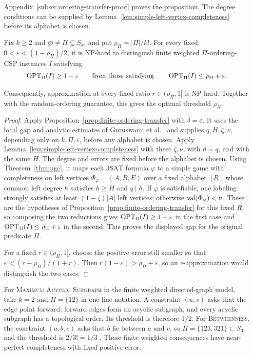 Appendix~\ref{subsec:ordering-transfer-proof} proves the proposition.
The degree conditions can be supplied by Lemma~\ref{lem:simple-left-vertex-completeness}
before its alphabet is chosen.

\begin{corollary}\label{cor:ordering-csp}
Fix \(k\ge2\) and \(\varnothing\ne\Pi\subsetneq S_k\), and put
\(\rho_\Pi=|\Pi|/k!\). For every fixed
\(0<\varepsilon<(1-\rho_\Pi)/2\), it is NP-hard to distinguish finite
weighted \(\Pi\)-ordering-CSP instances \(I\) satisfying
\[
 \operatorname{OPT}_\Pi(I)\ge1-\varepsilon
 \qquad\text{from those satisfying}\qquad
 \operatorname{OPT}_\Pi(I)\le\rho_\Pi+\varepsilon.
\]
\end{corollary}
Consequently, approximation at every fixed ratio
\(r\in(\rho_\Pi,1]\) is NP-hard. Together with the random-ordering
guarantee, this gives the optimal threshold \(\rho_\Pi\).
\begin{proof}
Apply Proposition~\ref{prop:finite-ordering-transfer} with
\(\delta=\varepsilon\). It uses the local gap and analytic estimates of
Guruswami et al.~\cite{GuruswamiEtAl2011OrderingCSP} and supplies
\(q,H,\zeta,\nu\), depending only on \(k,\Pi,\varepsilon\), before any
alphabet is chosen. Apply Lemma~\ref{lem:simple-left-vertex-completeness} with these
\(\zeta,\nu\), with \(d=q\), and with the same \(H\). The degree and errors
are fixed before the alphabet is chosen. Using
Theorem~\ref{thm:ugc}, it maps each \(\mathrm{3SAT}\) formula \(\varphi\)
to a simple game with completeness on left vertices \(\Phi_\varphi=(A,B,E)\) over a fixed
alphabet \([R]\) whose
common left degree \(h\) satisfies \(h\ge H\) and \(q\mid h\). If
\(\varphi\) is satisfiable, one labeling strongly satisfies at least
\((1-\zeta)|A|\) left vertices; otherwise \(\operatorname{val}(\Phi_\varphi)<\nu\).
These are the hypotheses of
Proposition~\ref{prop:finite-ordering-transfer} for this fixed \(R\), so
composing the two reductions gives \(\operatorname{OPT}_\Pi(I)\ge1-\varepsilon\) in the
first case and \(\operatorname{OPT}_\Pi(I)\le\rho_\Pi+\varepsilon\) in the second. This
proves the displayed gap for the original predicate \(\Pi\).

For a fixed \(r\in(\rho_\Pi,1]\), choose the positive error still
smaller so that \(\varepsilon<(r-\rho_\Pi)/(1+r)\). Then
\(r(1-\varepsilon)>\rho_\Pi+\varepsilon\), so an
\(r\)-approximation would distinguish the two cases.
\end{proof}

For \textsc{Maximum Acyclic Subgraph} in the finite weighted
directed-graph model, take \(k=2\) and \(\Pi=\{12\}\) in one-line
notation. A constraint \((u,v)\) asks that the edge point forward;
forward edges form an acyclic subgraph, and every acyclic subgraph has
a topological order. Its threshold is therefore \(1/2\).
For \textsc{Betweenness}, the constraint \((a,b,c)\) asks that \(b\)
lie between \(a\) and \(c\), so \(\Pi=\{123,321\}\subset S_3\) and
the threshold is \(2/3!=1/3\)
\cite[Theorem~1.1 and Section~1.2]{GuruswamiEtAl2011OrderingCSP}.
These finite weighted consequences have near-perfect completeness
with fixed positive error.


